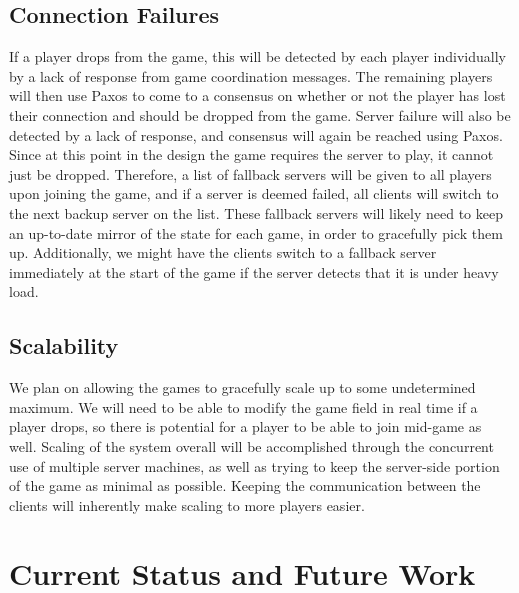 \documentclass{sig-alternate}
\begin{document}
\subsection{Connection Failures}

If a player drops from the game, this will be detected by each player
individually by a lack of response from game coordination messages. The
remaining players will then use Paxos to come to a consensus on whether or
not the player has lost their connection and should be dropped from the
game.  Server failure will also be detected by a lack of response, and
consensus will again be reached using Paxos.  Since at this point in the
design the game requires the server to play, it cannot just be dropped.
Therefore, a list of fallback servers will be given to all players upon
joining the game, and if a server is deemed failed, all clients will switch
to the next backup server on the list.  These fallback servers will likely
need to keep an up-to-date mirror of the state for each game, in order to
gracefully pick them up.  Additionally, we might have the clients switch to
a fallback server immediately at the start of the game if the server
detects that it is under heavy load.

\subsection{Scalability}

We plan on allowing the games to gracefully scale up to some undetermined
maximum.  We will need to be able to modify the game field in real time if
a player drops, so there is potential for a player to be able to join
mid-game as well.   Scaling of the system overall will be accomplished
through the concurrent use of multiple server machines, as well as trying
to keep the server-side portion of the game as minimal as possible.
Keeping the communication between the clients will inherently make scaling
to more players easier.



\section{Current Status and Future Work}
\label{current status}
\end{document}
